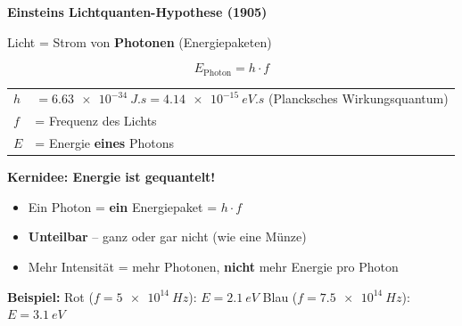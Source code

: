 \documentclass[11pt,a4paper]{article}
\begin{document}
\begin{tcolorbox}[infobox={Tafelbild 1: Einsteins Idee}]
\begin{center}
\textbf{Einsteins Lichtquanten-Hypothese (1905)}
\end{center}

\vspace{0.3em}

Licht = Strom von \textbf{Photonen} (Energiepaketen)

\vspace{0.3em}

$$\boxed{E_{\text{Photon}} = h \cdot f}$$

\vspace{0.3em}

\begin{tabular}{ll}
$h$ & $= \SI{6,63e-34}{J.s} = \SI{4,14e-15}{eV.s}$ (Plancksches Wirkungsquantum) \\
$f$ & = Frequenz des Lichts \\
$E$ & = Energie \textbf{eines} Photons \\
\end{tabular}

\vspace{0.5em}

\textbf{Kernidee: Energie ist gequantelt!}
\begin{itemize}[nosep]
\item Ein Photon = \textbf{ein} Energiepaket = $h \cdot f$
\item \textbf{Unteilbar} -- ganz oder gar nicht (wie eine Münze)
\item Mehr Intensität = mehr Photonen, \textbf{nicht} mehr Energie pro Photon
\end{itemize}

\vspace{0.3em}

\textbf{Beispiel:} Rot ($f = \SI{5e14}{Hz}$): $E = \SI{2,1}{eV}$ \quad Blau ($f = \SI{7,5e14}{Hz}$): $E = \SI{3,1}{eV}$
\end{tcolorbox}

\vspace{0.5em}
\end{document}
